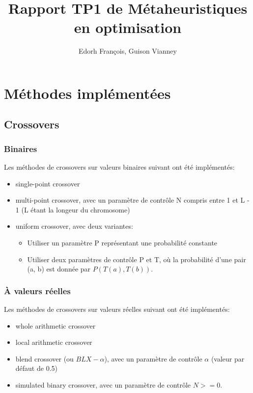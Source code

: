 \documentclass[12pt, letterpaper]{article}
\author{Edorh François, Guison Vianney}
\title{Rapport TP1 de Métaheuristiques en optimisation}
\begin{document}
\section{Méthodes implémentées}

\subsection{Crossovers}

\subsubsection{Binaires}

Les méthodes de crossovers sur valeurs binaires suivant ont été implémentés:
\begin{itemize}
\item single-point crossover\\
  
\item multi-point crossover, avec un paramètre de contrôle N compris
entre 1 et L - 1 (L étant la longeur du chromosome)\\
  
\item uniform crossover, avec deux variantes:
  \begin{itemize}
  \item Utiliser un paramètre P représentant une probabilité constante\\
    
  \item Utiliser deux paramètres de contrôle P et T, où la probabilité
    d'une pair (a, b) est donnée par $P(T(a), T(b))$.\\
    
  \end{itemize}
\end{itemize}

\subsubsection{À valeurs réelles}
Les méthodes de crossovers sur valeurs réelles suivant ont été implémentés:
\begin{itemize}
\item whole arithmetic crossover\\
  
\item local arithmetic crossover\\
  
\item blend crossover (ou $BLX-\alpha$), avec un paramètre de contrôle
  $\alpha$ (valeur par défaut de 0.5)\\
  
\item simulated binary crossover, avec un paramètre de contrôle $N >= 0$.\\
\end{itemize}
\end{document}
